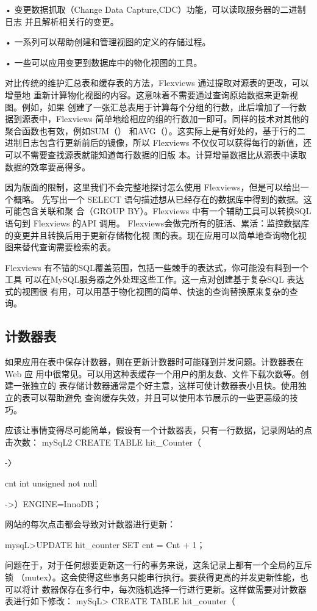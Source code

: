 • 变更数据抓取（Change Data Capture,CDC）功能，可以读取服务器的二进制日志
并且解析相关行的变更。

• 一系列可以帮助创建和管理视图的定义的存储过程。

• 一些可以应用变更到数据库中的物化视图的工具。

对比传统的维护汇总表和缓存表的方法，Flexviews 通过提取对源表的更改，可以增量地
重新计算物化视图的内容。这意味着不需要通过查询原始数据来更新视图。例如，如果
创建了一张汇总表用于计算每个分组的行数，此后增加了一行数据到源表中，Flexviews
简单地给相应的组的行数加一即可。同样的技术对其他的聚合函数也有效，例如SUM（）
和AVG（）。这实际上是有好处的，基于行的二进制日志包含行更新前后的镜像，所以
Flexviews 不仅仅可以获得每行的新值，还可以不需要查找源表就能知道每行数据的旧版
本。计算增量数据比从源表中读取数据的效率要高得多。

因为版面的限制，这里我们不会完整地探讨怎么使用 Flexviews，但是可以给出一个概略。
先写出一个 SELECT 语句描述想从已经存在的数据库中得到的数据。这可能包含关联和聚
合（GROUP BY）。Flexviews 中有一个辅助工具可以转换SQL 语句到 Flexviews 的API 调用。
Flexviews会做完所有的脏活、累活：监控数据库的变更并且转换后用于更新存储物化视
图的表。现在应用可以简单地查询物化视图来替代查询需要检索的表。

Flexviews 有不错的SQL覆盖范围，包括一些棘手的表达式，你可能没有料到一个工具
可以在MySQL服务器之外处理这些工作。这一点对创建基于复杂SQL 表达式的视图很
有用，可以用基于物化视图的简单、快速的查询替换原来复杂的查询。

\subsection{计数器表}
如果应用在表中保存计数器，则在更新计数器时可能碰到并发问题。计数器表在Web 应
用中很常见。可以用这种表缓存一个用户的朋友数、文件下载次数等。创建一张独立的
表存储计数器通常是个好主意，这样可使计数器表小且快。使用独立的表可以帮助避免
查询缓存失效，并且可以使用本节展示的一些更高级的技巧。

应该让事情变得尽可能简单，假设有一个计数器表，只有一行数据，记录网站的点击次数：
mySqL2 CREATE TABLE hit\_Counter（

-〉

cnt int unsigned not null

->）ENGINE=InnoDB；

网站的每次点击都会导致对计数器进行更新：

mysqL>UPDATE hit\_counter SET cnt = Cnt + 1；

问题在于，对于任何想要更新这一行的事务来说，这条记录上都有一个全局的互斥锁
（mutex）。这会使得这些事务只能串行执行。要获得更高的并发更新性能，也可以将计
数器保存在多行中，每次随机选择一行进行更新。这样做需要对计数器表进行如下修改：
mySqL> CREATE TABLE hit\_counter（

